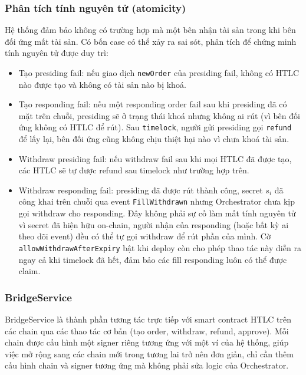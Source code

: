 \subsubsection{Phân tích tính nguyên tử (atomicity)}

Hệ thống đảm bảo không có trường hợp mà một bên nhận tài sản trong khi bên đối ứng mất tài sản. 
Có bốn case có thể xảy ra sai sót, phân tích để chứng minh tính nguyên tử được duy trì:

\begin{itemize}
    \item Tạo presiding fail: nếu giao dịch \texttt{newOrder} của presiding fail, không có HTLC nào được tạo và không có tài sản nào bị khoá.
    \item Tạo responding fail: nếu một responding order fail sau khi presiding đã có mặt trên chuỗi, presiding sẽ ở trạng thái khoá nhưng không ai rút (vì bên đối ứng không có HTLC để rút). Sau \texttt{timelock}, người gửi presiding gọi \texttt{refund} để lấy lại, bên đối ứng cũng không chịu thiệt hại nào vì chưa khoá tài sản.
    \item Withdraw presiding fail: nếu withdraw fail sau khi mọi HTLC đã được tạo, các HTLC sẽ tự được refund sau timelock như trường hợp trên.
    \item Withdraw responding fail: presiding đã được rút thành công, secret $s_i$ đã công khai trên chuỗi qua event \texttt{FillWithdrawn} nhưng Orchestrator chưa kịp gọi withdraw cho responding. Đây không phải sự cố làm mất tính nguyên tử vì secret đã hiện hữu on-chain, người nhận của responding (hoặc bất kỳ ai theo dõi event) đều có thể tự gọi withdraw để rút phần của mình. Cờ \texttt{allowWithdrawAfterExpiry} bật khi deploy còn cho phép thao tác này diễn ra ngay cả khi timelock đã hết, đảm bảo các fill responding luôn có thể được claim.
\end{itemize}

\subsubsection{BridgeService}

BridgeService là thành phần tương tác trực tiếp với smart contract HTLC trên các chain
qua các thao tác cơ bản (tạo order, withdraw,
refund, approve).
Mỗi chain được cấu hình một signer riêng tương ứng với một ví của hệ thống, giúp
việc mở rộng sang các chain mới trong tương lai trở nên đơn giản, chỉ cần thêm
cấu hình chain và signer tương ứng mà không phải sửa logic của Orchestrator.

